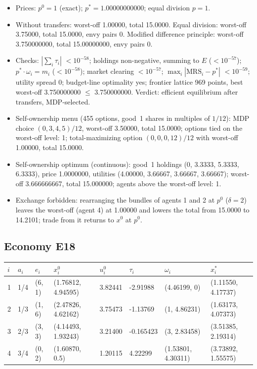 \begin{itemize}[leftmargin=1.2em,itemsep=0pt,topsep=2pt]\footnotesize
\item Prices: $p^0 = 1$ (exact); $p^* = 1.00000000000$; equal division $p = 1$.
\item Without transfers: worst-off 1.00000, total 15.0000. Equal division: worst-off 3.75000, total 15.0000, envy pairs 0. Modified difference principle: worst-off 3.750000000, total 15.00000000, envy pairs 0.
\item Checks: $|\sum_i\tau_i|$ $<10^{-58}$; holdings non-negative, summing to $E$ ($<10^{-57}$); $p^*\cdot\omega_i = m_i$ ($<10^{-58}$); market clearing $<10^{-57}$; $\max_i|\mathrm{MRS}_i - p^*|$ $<10^{-59}$; utility spread 0; budget-line optimality yes; frontier lattice 969 points, best worst-off 3.750000000 $\leq$ 3.750000000. Verdict: efficient equilibrium after transfers, MDP-selected.
\item Self-ownership menu (455 options, good~1 shares in multiples of $1/12$): MDP choice $(0, 3, 4, 5)/12$, worst-off 3.50000, total 15.0000; options tied on the worst-off level: 1; total-maximizing option $(0, 0, 0, 12)/12$ with worst-off 1.00000, total 15.0000.
\item Self-ownership optimum (continuous): good~1 holdings (0, 3.3333, 5.3333, 6.3333), price 1.0000000, utilities (4.00000, 3.66667, 3.66667, 3.66667); worst-off 3.666666667, total 15.000000; agents above the worst-off level: 1.
\item Exchange forbidden: rearranging the bundles of agents 1 and 2 at $p^0$ ($\delta = 2$) leaves the worst-off (agent 4) at 1.00000 and lowers the total from 15.0000 to 14.2101; trade from it returns to $x^0$ at $p^0$.
\end{itemize}

\subsection*{Economy E18}
\label{ec:E18}
{\scriptsize\setlength{\tabcolsep}{3pt}
\begin{tabular}{@{}llllllll@{}}
\toprule
$i$ & $a_i$ & $e_i$ & $x^0_i$ & $u^0_i$ & $\tau_i$ & $\omega_i$ & $x^*_i$ \\
\midrule
1 & 1/4 & (6, 1) & (1.76812, 4.94595) & 3.82441 & -2.91988 & (4.46199, 0) & (1.11550, 4.17737) \\
2 & 1/3 & (1, 6) & (2.47826, 4.62162) & 3.75473 & -1.13769 & (1, 4.86231) & (1.63173, 4.07373) \\
3 & 2/3 & (3, 3) & (4.14493, 1.93243) & 3.21400 & -0.165423 & (3, 2.83458) & (3.51385, 2.19314) \\
4 & 3/4 & (0, 2) & (1.60870, 0.5) & 1.20115 & 4.22299 & (1.53801, 4.30311) & (3.73892, 1.55575) \\
\bottomrule\end{tabular}}

